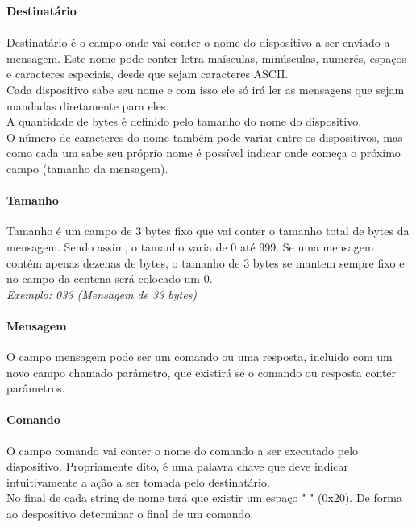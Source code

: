 \documentclass[11pt,	 papera4]{article}
\begin{document}
\textbf{Destinatário}
\paragraph{}Destinatário é o campo onde vai conter o nome do dispositivo a ser enviado a mensagem.
Este nome pode conter letra maísculas, minúsculas, numerés, espaços e caracteres especiais, desde que sejam caracteres ASCII. \\
Cada dispositivo sabe seu nome e com isso ele só irá ler as mensagens que sejam mandadas diretamente para eles. \\
A quantidade de bytes é definido pelo tamanho do nome do dispositivo. \\ 
O número de caracteres do nome também pode variar entre os dispositivos, mas como cada um sabe seu próprio nome é possível indicar onde começa o próximo campo (tamanho da mensagem).



\paragraph{\textbf{Tamanho} \newline \newline} 

Tamanho é um campo de 3 bytes fixo que vai conter o tamanho total de bytes da mensagem. Sendo assim, o tamanho varia de 0 até 999.
Se uma mensagem contém apenas dezenas de bytes, o tamanho de 3 bytes se mantem sempre fixo e no campo da centena será colocado um 0.\\

\textsl{Exemplo: 033 (Mensagem de 33 bytes)} \\

\paragraph{\textbf{Mensagem} \newline \newline} 
O campo mensagem pode ser um comando ou uma resposta, incluido com um novo campo chamado parâmetro, que existirá se o comando ou resposta conter parâmetros.

\paragraph{\textbf{Comando} \newline \newline} 
O campo comando vai conter o nome do comando a ser executado pelo dispositivo. Propriamente dito, é uma palavra chave que deve indicar intuitivamente a ação a ser tomada pelo destinatário. \\
No final de cada string de nome terá que existir um espaço " " (0x20). De forma ao despositivo determinar o final de um comando. \\
\end{document}
